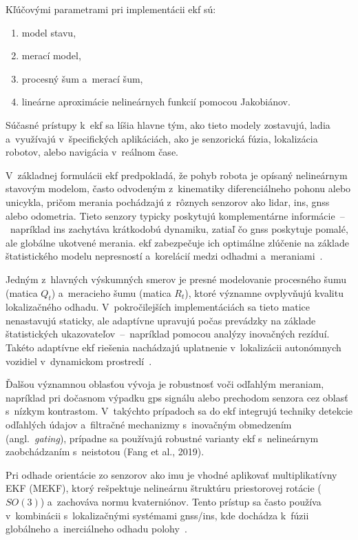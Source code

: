   Kľúčovými parametrami pri implementácii \acrshort{ekf} sú:
  \begin{enumerate}
    \item model stavu,
    \item merací model,
    \item procesný šum a~merací šum,
    \item lineárne aproximácie nelineárnych funkcií pomocou Jakobiánov.
  \end{enumerate}
  Súčasné prístupy k~\acrshort{ekf} sa líšia hlavne tým, ako tieto modely zostavujú, ladia a~využívajú v~špecifických aplikáciách, ako je senzorická fúzia, lokalizácia robotov, alebo navigácia v~reálnom čase.

  V~základnej formulácii \acrshort{ekf} predpokladá, že pohyb robota je opísaný nelineárnym stavovým modelom, často odvodeným z~kinematiky diferenciálneho pohonu alebo unicykla, pričom merania pochádzajú z~rôznych senzorov ako \acrshort{lidar}, \acrshort{ins}, \acrshort{gnss} alebo odometria. Tieto senzory typicky poskytujú komplementárne informácie~--~napríklad \acrshort{ins} zachytáva krátkodobú dynamiku, zatiaľ čo \acrshort{gnss} poskytuje pomalé, ale globálne ukotvené merania\@. \acrshort{ekf} zabezpečuje ich optimálne zlúčenie na základe štatistického modelu nepresností a~korelácií medzi odhadmi a~meraniami~\cite{thrunProbabilisticRobotics2005}.

  Jedným z~hlavných výskumných smerov je presné modelovanie procesného šumu (matica $Q_t$) a~meracieho šumu (matica $R_t$), ktoré významne ovplyvňujú kvalitu lokalizačného odhadu. V~pokročilejších implementáciách sa tieto matice nenastavujú staticky, ale adaptívne upravujú počas prevádzky na základe štatistických ukazovateľov~--~napríklad pomocou analýzy inovačných rezíduí. Takéto adaptívne \acrshort{ekf} riešenia nachádzajú uplatnenie v~lokalizácii autonómnych vozidiel v~dynamickom prostredí~\cite{wanUnscentedKalmanFilter2000}.

  Ďalšou významnou oblasťou vývoja je robustnosť voči odľahlým meraniam, napríklad pri dočasnom výpadku \acrshort{gps} signálu alebo prechodom senzora cez oblasť s~nízkym kontrastom. V~takýchto prípadoch sa do \acrshort{ekf} integrujú techniky detekcie odľahlých údajov a~filtračné mechanizmy s~inovačným obmedzením (angl.\ \emph{gating}), prípadne sa používajú robustné varianty \acrshort{ekf} s~nelineárnym zaobchádzaním s~neistotou (Fang et al., 2019).

  Pri odhade orientácie zo senzorov ako \acrshort{imu} je vhodné aplikovať multiplikatívny EKF (MEKF), ktorý rešpektuje nelineárnu štruktúru priestorovej rotácie ($SO(3)$) a~zachováva normu kvaterniónov. Tento prístup sa často používa v~kombinácii s~lokalizačnými systémami \acrshort{gnss}/\acrshort{ins}, kde dochádza k~fúzii globálneho a~inerciálneho odhadu polohy~\cite{trawnyIndirectKalmanFilter2005}.

